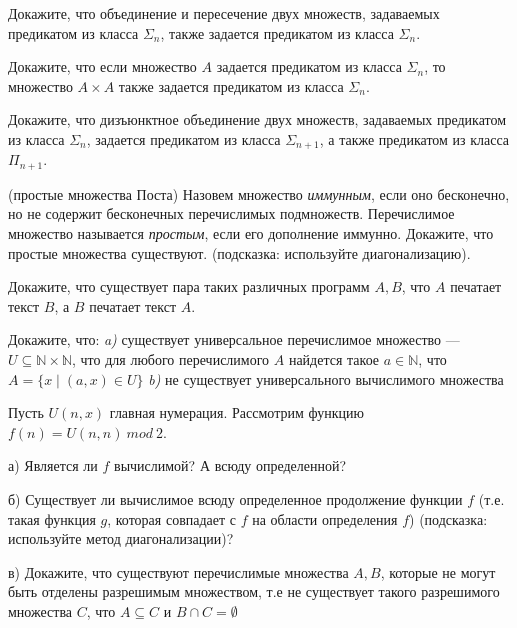 \setcounter{curtask}{21}



\begin{task}
    Докажите, что объединение и пересечение двух множеств, задаваемых предикатом из
    класса $\Sigma_n$, также задается предикатом из класса $\Sigma_n$.
\end{task}

\begin{task}
    Докажите, что если множество $A$ задается предикатом из класса $\Sigma_n$, то
    множество $A \times A$ также задается предикатом из класса $\Sigma_n$.
\end{task}

\begin{task}
    Докажите, что дизъюнктное объединение двух множеств, задаваемых предикатом из
    класса $\Sigma_n$, задается предикатом из класса $\Sigma_{n + 1}$, а также
    предикатом из класса $\Pi_{n + 1}$.
\end{task}

\begin{task} (простые множества Поста)
    Назовем множество {\it иммунным}, если оно бесконечно, но не
    содержит бесконечных перечислимых подмножеств. Перечислимое
    множество называется {\it простым}, если его дополнение иммунно.
    Докажите, что простые множества существуют. (подсказка: используйте
    диагонализацию).
\end{task}




\breakline

\begin{ptask}{16}
    Докажите, что существует пара таких различных программ $A, B$, что $A$ печатает
    текст $B$, а $B$ печатает текст $A$.
\end{ptask}

\begin{ptask}{17}
    Докажите, что: {\it a)} существует универсальное перечислимое множество ---
    $U \subseteq \mathbb{N} \times \mathbb{N}$, что для любого
    перечислимого $A$ найдется такое $a \in \mathbb{N}$, что $A = \{x
    \mid (a, x) \in U\}$
    {\it b)} не существует универсального вычислимого множества
\end{ptask}


\begin{ptask}{18}
    Пусть $U(n, x)$ главная нумерация. Рассмотрим функцию $f(n) = U(n, n)~mod~2$.
    
    а) Является ли $f$ вычислимой? А всюду определенной?

    б) Существует ли вычислимое всюду определенное продолжение функции $f$
    (т.е. такая функция $g$, которая совпадает с $f$ на области определения $f$)
    (подсказка: используйте метод диагонализации)?

    в) Докажите, что существуют перечислимые множества $A, B$, которые не могут быть
    отделены разрешимым множеством, т.е не существует такого разрешимого множества
    $C$, что $A \subseteq C$ и $B \cap C = \emptyset$
\end{ptask}


